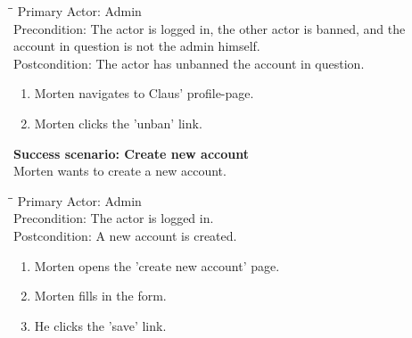 \begin{tabbing}
\hspace{5mm}\=\hspace{26mm}\=\kill
\>Primary Actor:\> Admin\\
\>Precondition:\> The actor is logged in, the other actor is banned, and the\\ \hspace{85px} account in question is not the admin himself.\\
\>Postcondition:\> The actor has unbanned the account in question.
\end{tabbing}
\begin{enumerate} \setlength{\itemsep}{-1mm}
	\item Morten navigates to Claus' profile-page.
	\item Morten clicks the 'unban' link.
\end{enumerate}
\vspace{3mm}
\textbf{Success scenario: Create new account} \\
Morten wants to create a new account.
\begin{tabbing}
\hspace{5mm}\=\hspace{26mm}\=\kill
\>Primary Actor:\> Admin\\
\>Precondition:\> The actor is logged in.\\
\>Postcondition:\> A new account is created.
\end{tabbing}
\begin{enumerate} \setlength{\itemsep}{-1mm}
	\item Morten opens the 'create new account' page.
	\item Morten fills in the form.
	\item He clicks the 'save' link.
\end{enumerate}